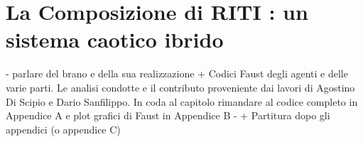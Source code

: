 \section{La Composizione di RITI : un sistema caotico ibrido}
\label{sec:La Composizione di RITI : un sistema caotico ibrido}

- parlare del brano e della sua realizzazione +
Codici Faust degli agenti e delle varie parti.
Le analisi condotte e il contributo proveniente dai lavori
di Agostino Di Scipio e Dario Sanfilippo.
In coda al capitolo rimandare al codice completo in Appendice A e plot
grafici di Faust in Appendice B -
+ Partitura dopo gli appendici (o appendice C)
